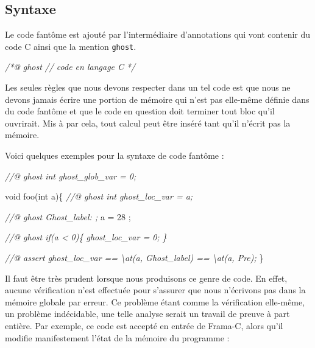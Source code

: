 \documentclass[12pt,francais,]{scrbook}
\newenvironment{Shaded}{}{}
\newcommand{\DataTypeTok}[1]{\textcolor[rgb]{0.56,0.13,0.00}{{#1}}}
\newcommand{\DecValTok}[1]{\textcolor[rgb]{0.25,0.63,0.44}{{#1}}}
\newcommand{\CommentTok}[1]{\textcolor[rgb]{0.38,0.63,0.69}{\textit{{#1}}}}
\newcommand{\NormalTok}[1]{{#1}}
\begin{document}
\subsection{Syntaxe}\label{syntaxe-4}

Le code fantôme est ajouté par l'intermédiaire d'annotations qui vont
contenir du code C ainsi que la mention \texttt{ghost}.

\begin{footnotesize}\begin{Shaded}
\begin{Highlighting}[]
\CommentTok{/*@}
\CommentTok{  ghost}
\CommentTok{  // code en langage C}
\CommentTok{*/}
\end{Highlighting}
\end{Shaded}\end{footnotesize}

Les seules règles que nous devons respecter dans un tel code est que
nous ne devons jamais écrire une portion de mémoire qui n'est pas
elle-même définie dans du code fantôme et que le code en question doit
terminer tout bloc qu'il ouvrirait. Mis à par cela, tout calcul peut
être inséré tant qu'il n'écrit pas la mémoire.

Voici quelques exemples pour la syntaxe de code fantôme :

\begin{footnotesize}\begin{Shaded}
\begin{Highlighting}[]
\CommentTok{//@ ghost int ghost_glob_var = 0;}

\DataTypeTok{void} \NormalTok{foo(}\DataTypeTok{int} \NormalTok{a)\{}
  \CommentTok{//@ ghost int ghost_loc_var = a;}

  \CommentTok{//@ ghost Ghost_label: ;}
  \NormalTok{a = }\DecValTok{28} \NormalTok{;}

  \CommentTok{//@ ghost if(a < 0)\{ ghost_loc_var = 0; \}}

  \CommentTok{//@ assert ghost_loc_var == \textbackslash{}at(a, Ghost_label) == \textbackslash{}at(a, Pre);}
\NormalTok{\}}
\end{Highlighting}
\end{Shaded}\end{footnotesize}

Il faut être très prudent lorsque nous produisons ce genre de code. En
effet, aucune vérification n'est effectuée pour s'assurer que nous
n'écrivons pas dans la mémoire globale par erreur. Ce problème étant
comme la vérification elle-même, un problème indécidable, une telle
analyse serait un travail de preuve à part entière. Par exemple, ce code
est accepté en entrée de Frama-C, alors qu'il modifie manifestement
l'état de la mémoire du programme :
\end{document}
